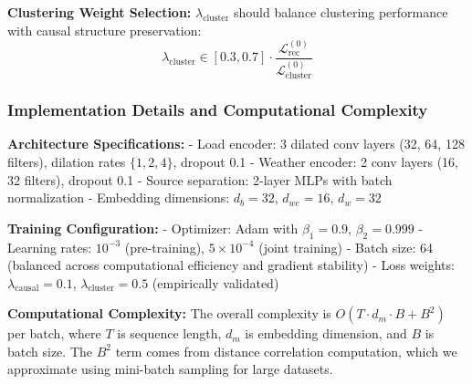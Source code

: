 \documentclass[journal]{IEEEtran}
\begin{document}
\textbf{Clustering Weight Selection:} $\lambda_{\text{cluster}}$ should balance clustering performance with causal structure preservation:
\begin{equation}
\lambda_{\text{cluster}} \in [0.3, 0.7] \cdot \frac{\mathcal{L}_{\text{rec}}^{(0)}}{\mathcal{L}_{\text{cluster}}^{(0)}}
\label{eq:cluster_weight_selection}
\end{equation}

\subsubsection{Implementation Details and Computational Complexity}

\textbf{Architecture Specifications:}
- Load encoder: 3 dilated conv layers (32, 64, 128 filters), dilation rates $\{1, 2, 4\}$, dropout 0.1
- Weather encoder: 2 conv layers (16, 32 filters), dropout 0.1
- Source separation: 2-layer MLPs with batch normalization
- Embedding dimensions: $d_b = 32$, $d_{we} = 16$, $d_w = 32$

\textbf{Training Configuration:}
- Optimizer: Adam with $\beta_1 = 0.9$, $\beta_2 = 0.999$
- Learning rates: $10^{-3}$ (pre-training), $5 \times 10^{-4}$ (joint training)
- Batch size: 64 (balanced across computational efficiency and gradient stability)
- Loss weights: $\lambda_{\text{causal}} = 0.1$, $\lambda_{\text{cluster}} = 0.5$ (empirically validated)

\textbf{Computational Complexity:} The overall complexity is $O(T \cdot d_m \cdot B + B^2)$ per batch, where $T$ is sequence length, $d_m$ is embedding dimension, and $B$ is batch size. The $B^2$ term comes from distance correlation computation, which we approximate using mini-batch sampling for large datasets.
\end{document}
